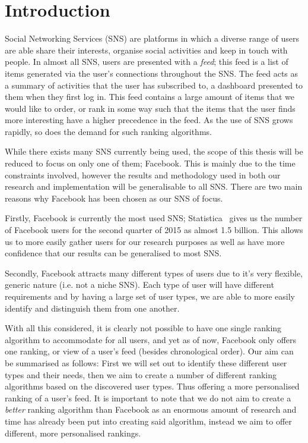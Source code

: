 \chapter{Introduction}\label{ch:intro}

Social Networking Services (SNS) are platforms in which a diverse range of users are able share their interests, organise social activities and keep in touch with people. In almost all SNS, users are presented with a \textit{feed}; this feed is a list of items generated via the user's connections throughout the SNS. The feed acts as a summary of activities that the user has subscribed to, a dashboard presented to them when they first log in. This feed contains a large amount of items that we would like to order, or rank in some way such that the items that the user finds more interesting have a higher precedence in the feed. As the use of SNS grows rapidly, so does the demand for such ranking algorithms.

While there exists many SNS currently being used, the scope of this thesis will be reduced to focus on only one of them; Facebook. This is mainly due to the time constraints involved, however the results and methodology used in both our research and implementation will be generalisable to all SNS. There are two main reasons why Facebook has been chosen as our SNS of focus.

Firstly, Facebook is currently the most used SNS; Statistica~\cite{statistica2015facebook} gives us the number of Facebook users for the second quarter of 2015 as almost 1.5 billion. This allows us to more easily gather users for our research purposes as well as have more confidence that our results can be generalised to most SNS.

Secondly, Facebook attracts many different types of users due to it's very flexible, generic nature (i.e. not a niche SNS). Each type of user will have different requirements and by having a large set of user types, we are able to more easily identify and distinguish them from one another.

With all this considered, it is clearly not possible to have one single ranking algorithm to accommodate for all users, and yet as of now, Facebook only offers one ranking, or view of a user's feed (besides chronological order). Our aim can be summarised as follows: First we will set out to identify these different user types and their needs, then we aim to create a number of different ranking algorithms based on the discovered user types. Thus offering a more personalised ranking of a user's feed. It is important to note that we do not aim to create a \textit{better} ranking algorithm than Facebook as an enormous amount of research and time has already been put into creating said algorithm, instead we aim to offer different, more personalised rankings.


